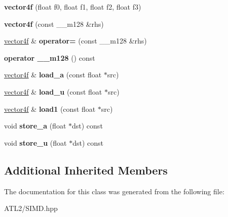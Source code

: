 \begin{DoxyCompactItemize}
\item 
\hypertarget{classsimd_1_1vector4f_a851a8e9f17c7608f082a110d48511d9d}{{\bfseries vector4f} (float f0, float f1, float f2, float f3)}\label{classsimd_1_1vector4f_a851a8e9f17c7608f082a110d48511d9d}

\item 
\hypertarget{classsimd_1_1vector4f_acfe638dab1c1d516989304bd62b87522}{{\bfseries vector4f} (const \+\_\+\+\_\+m128 \&rhs)}\label{classsimd_1_1vector4f_acfe638dab1c1d516989304bd62b87522}

\item 
\hypertarget{classsimd_1_1vector4f_ac6b2d78f7edf02288544a273109f7bce}{\hyperlink{classsimd_1_1vector4f}{vector4f} \& {\bfseries operator=} (const \+\_\+\+\_\+m128 \&rhs)}\label{classsimd_1_1vector4f_ac6b2d78f7edf02288544a273109f7bce}

\item 
\hypertarget{classsimd_1_1vector4f_a433d39bba6d70a4406fb70315d1d700c}{{\bfseries operator \+\_\+\+\_\+m128} () const }\label{classsimd_1_1vector4f_a433d39bba6d70a4406fb70315d1d700c}

\item 
\hypertarget{classsimd_1_1vector4f_a3f144eedb574683f0a74c816f06da9b5}{\hyperlink{classsimd_1_1vector4f}{vector4f} \& {\bfseries load\+\_\+a} (const float $\ast$src)}\label{classsimd_1_1vector4f_a3f144eedb574683f0a74c816f06da9b5}

\item 
\hypertarget{classsimd_1_1vector4f_a96eb6874cdcc0da473900f7798219ef0}{\hyperlink{classsimd_1_1vector4f}{vector4f} \& {\bfseries load\+\_\+u} (const float $\ast$src)}\label{classsimd_1_1vector4f_a96eb6874cdcc0da473900f7798219ef0}

\item 
\hypertarget{classsimd_1_1vector4f_a146d26ac180a2165ffbc35ff1301747f}{\hyperlink{classsimd_1_1vector4f}{vector4f} \& {\bfseries load1} (const float $\ast$src)}\label{classsimd_1_1vector4f_a146d26ac180a2165ffbc35ff1301747f}

\item 
\hypertarget{classsimd_1_1vector4f_a9084f345c629897c16c73858b112677d}{void {\bfseries store\+\_\+a} (float $\ast$dst) const }\label{classsimd_1_1vector4f_a9084f345c629897c16c73858b112677d}

\item 
\hypertarget{classsimd_1_1vector4f_ab7bc248d1ac6e5dbc7aba78034063ac1}{void {\bfseries store\+\_\+u} (float $\ast$dst) const }\label{classsimd_1_1vector4f_ab7bc248d1ac6e5dbc7aba78034063ac1}

\end{DoxyCompactItemize}
\subsection*{Additional Inherited Members}


The documentation for this class was generated from the following file\+:\begin{DoxyCompactItemize}
\item 
A\+T\+L2/S\+I\+M\+D.\+hpp\end{DoxyCompactItemize}
